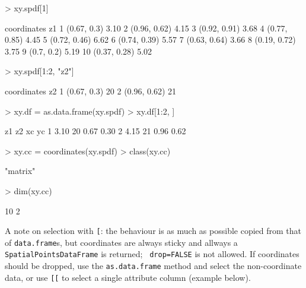 \documentclass{article}
\begin{document}
\begin{Schunk}
\begin{Sinput}
> xy.spdf[1]
\end{Sinput}
\begin{Soutput}
    coordinates   z1
1   (0.67, 0.3) 3.10
2  (0.96, 0.62) 4.15
3  (0.92, 0.91) 3.68
4  (0.77, 0.85) 4.45
5  (0.72, 0.46) 6.62
6  (0.74, 0.39) 5.57
7  (0.63, 0.64) 3.66
8  (0.19, 0.72) 3.75
9    (0.7, 0.2) 5.19
10 (0.37, 0.28) 5.02
\end{Soutput}
\begin{Sinput}
> xy.spdf[1:2, "z2"]
\end{Sinput}
\begin{Soutput}
   coordinates z2
1  (0.67, 0.3) 20
2 (0.96, 0.62) 21
\end{Soutput}
\begin{Sinput}
> xy.df = as.data.frame(xy.spdf)
> xy.df[1:2, ]
\end{Sinput}
\begin{Soutput}
    z1 z2   xc   yc
1 3.10 20 0.67 0.30
2 4.15 21 0.96 0.62
\end{Soutput}
\begin{Sinput}
> xy.cc = coordinates(xy.spdf)
> class(xy.cc)
\end{Sinput}
\begin{Soutput}
[1] "matrix"
\end{Soutput}
\begin{Sinput}
> dim(xy.cc)
\end{Sinput}
\begin{Soutput}
[1] 10  2
\end{Soutput}
\end{Schunk}
A note on selection with \verb|[|: the behaviour is as much as possible
copied from that of {\tt data.frame}s, but coordinates are always
sticky and allways a {\tt SpatialPointsDataFrame} is returned; {\tt
drop=FALSE} is not allowed. If coordinates should be dropped, use the
{\tt as.data.frame} method and select the non-coordinate data, or use
\verb|[[| to select a single attribute column (example below).
\end{document}
